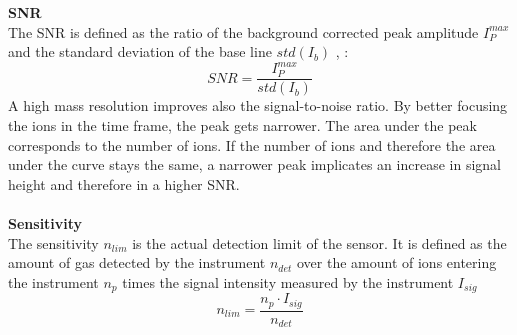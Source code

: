	\textbf{SNR}\\ %
	The SNR is defined as the ratio of the background corrected peak amplitude $I^{max}_P$ and the standard deviation of the base line $std(I_b)$ \cite{Agilent_TechNote_SNR}, \cite{Master_Meyer}: %
	\begin{equation}
		SNR = \frac{I^{max}_P}{std(I_b)}
		\label{eq:SNR}
	\end{equation}
	A high mass resolution improves also the signal-to-noise ratio. By better focusing the ions in the time frame, the peak gets narrower. The area under the peak corresponds to the number of ions. If the number of ions and therefore the area under the curve stays the same, a narrower peak implicates an increase in signal height and therefore in a higher SNR.\\ %
	\\
	\textbf{Sensitivity} \\ %
	The sensitivity $n_{lim}$ is the actual detection limit of the sensor. It is defined as the amount of gas detected by the instrument $n_{det}$ over the amount of ions entering the instrument $n_{p}$ times the signal intensity measured by the instrument $I_{sig}$
	\begin{equation}
		n_{lim} = \frac{n_p \cdot I_{sig}}{n_{det}}
	\end{equation}
	
	

	

	
	
	


